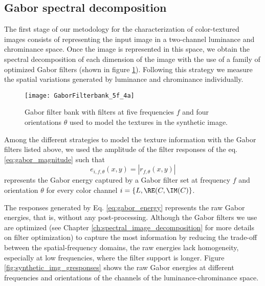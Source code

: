 \subsection{Gabor spectral decomposition}
The first stage of our metodology for the characterization of color-textured images consists of representing the input image in a two-channel luminance and chrominance space. Once the image is represented in this space, we obtain the spectral decomposition of each dimension of the image with the use of a family of optimized Gabor filters (shown in figure \ref{fig:gabrfilter_5f_4a}). Following this strategy we measure the spatial variations generated by luminance and chrominance individually.
\begin{figure}[!ht]
    \centering
    \texttt{[image: GaborFilterbank\_5f\_4a]}
    \caption{Gabor filter bank with filters at five frequencies $f$ and four orientations $\theta$ used to model the textures in the synthetic image.}\label{fig:gabrfilter_5f_4a}    
\end{figure}

Among the different strategies to model the texture information with the Gabor filters listed above, we used the amplitude of the filter responses of the eq. \eqref{eq:gabor_magnitude} such that
\begin{equation}\label{eq:gabor_energy}
	e_{i, f, \theta}(x,y) = |r_{f, \theta}(x,y)|
\end{equation}
represents the Gabor energy captured by a Gabor filter set at frequency $f$ and orientation $\theta$ for every color channel  $i=\{L, \RE(C, \IM(C)\}$. 

The responses generated by Eq. \eqref{eq:gabor_energy} represents the raw Gabor energies, that is, without any post-processing. Although the Gabor filters we use are optimized (see Chapter \ref{ch:spectral_image_decomposition} for more details on filter optimization) to capture the most information by reducing the trade-off between the spatial-frequency domains, the raw energies lack homogeneity, especially at low frequencies, where the filter support is longer. Figure \ref{fig:synthetic_img_gresponses} shows the raw Gabor energies at different frequencies and orientations of the channels of the luminance-chrominance space. 

